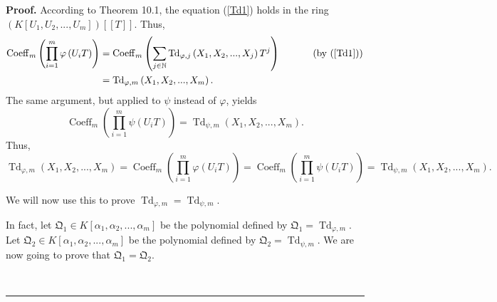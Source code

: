 \documentclass[numbers=enddot,12pt,final,onecolumn,notitlepage]{scrartcl}%
\newenvironment{proof}[1][Proof]{\noindent\textbf{#1.} }{\ \rule{0.5em}{0.5em}}
\begin{document}
\begin{proof}
According to Theorem 10.1, the equation (\ref{Td1}) holds in the ring $\left(
K\left[  U_{1},U_{2},...,U_{m}\right]  \right)  \left[  \left[  T\right]
\right]  $. Thus,%
\begin{align*}
\operatorname*{Coeff}\nolimits_{m}\left(  \prod\limits_{i=1}^{m}\varphi\left(
U_{i}T\right)  \right)   &  =\operatorname*{Coeff}\nolimits_{m}\left(
\sum_{j\in\mathbb{N}}\operatorname*{Td}\nolimits_{\varphi,j}\left(
X_{1},X_{2},...,X_{j}\right)  T^{j}\right)  \ \ \ \ \ \ \ \ \ \ \left(
\text{by (\ref{Td1})}\right) \\
&  =\operatorname*{Td}\nolimits_{\varphi,m}\left(  X_{1},X_{2},...,X_{m}%
\right)  .
\end{align*}
The same argument, but applied to $\psi$ instead of $\varphi$, yields%
\[
\operatorname*{Coeff}\nolimits_{m}\left(  \prod\limits_{i=1}^{m}\psi\left(
U_{i}T\right)  \right)  =\operatorname*{Td}\nolimits_{\psi,m}\left(
X_{1},X_{2},...,X_{m}\right)  .
\]
Thus,%
\[
\operatorname*{Td}\nolimits_{\varphi,m}\left(  X_{1},X_{2},...,X_{m}\right)
=\operatorname*{Coeff}\nolimits_{m}\left(  \prod\limits_{i=1}^{m}%
\varphi\left(  U_{i}T\right)  \right)  =\operatorname*{Coeff}\nolimits_{m}%
\left(  \prod\limits_{i=1}^{m}\psi\left(  U_{i}T\right)  \right)
=\operatorname*{Td}\nolimits_{\psi,m}\left(  X_{1},X_{2},...,X_{m}\right)  .
\]


We will now use this to prove $\operatorname*{Td}\nolimits_{\varphi
,m}=\operatorname*{Td}\nolimits_{\psi,m}$.

In fact, let $\mathfrak{Q}_{1}\in K\left[  \alpha_{1},\alpha_{2}%
,...,\alpha_{m}\right]  $ be the polynomial defined by $\mathfrak{Q}%
_{1}=\operatorname*{Td}\nolimits_{\varphi,m}$. Let $\mathfrak{Q}_{2}\in
K\left[  \alpha_{1},\alpha_{2},...,\alpha_{m}\right]  $ be the polynomial
defined by $\mathfrak{Q}_{2}=\operatorname*{Td}\nolimits_{\psi,m}$. We are now
going to prove that $\mathfrak{Q}_{1}=\mathfrak{Q}_{2}$.


\end{proof}
\end{document}

